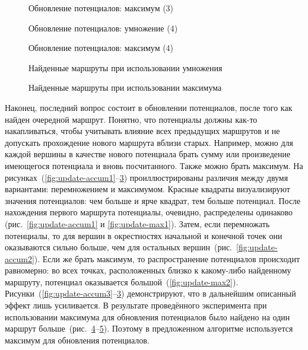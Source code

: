 \begin{figure}
    \caption{Обновление потенциалов: максимум (3)}
    \label{fig:update-max3}
\end{figure}

\begin{figure}
    \caption{Обновление потенциалов: умножение (4)}
    \label{fig:update-accum4}
\end{figure}

\begin{figure}
    \caption{Обновление потенциалов: максимум (4)}
    \label{fig:update-max4}
\end{figure}

\begin{figure}
    \caption{Найденные маршруты при использовании умножения}
    \label{fig:update-accum-result}
\end{figure}

\begin{figure}
    \caption{Найденные маршруты при использовании максимума}
    \label{fig:update-max-result}
\end{figure}

Наконец, последний вопрос состоит в обновлении потенциалов, после того
как найден очередной маршрут. Понятно, что потенциалы должны как-то
накапливаться, чтобы учитывать влияние всех предыдущих маршрутов и не
допускать прохождение нового маршрута вблизи старых. Например, можно
для каждой вершины в качестве нового потенциала брать сумму или
произведение имеющегося потенциала и вновь посчитанного. Также можно
брать максимум. На
рисунках~(\ref{fig:update-accum1}--\ref{fig:update-max4})
проиллюстрированы различия между двумя вариантами: перемножением и
максимумом. Красные квадраты визуализируют значения потенциалов: чем
больше и ярче квадрат, тем больше потенциал. После нахождения первого
маршрута потенциалы, очевидно, распределены одинаково
(рис.~\ref{fig:update-accum1} и \ref{fig:update-max1}). Затем, если
перемножать потенциалы, то для вершин в окрестностях начальной и
конечной точек они оказываются сильно больше, чем для остальных
вершин~(рис.~\ref{fig:update-accum2}). Если же брать максимум, то
распространение потенциалов происходит равномерно: во всех точках,
расположенных близко к какому-либо найденному маршруту, потенциал
оказывается большой~(\ref{fig:update-max2}).
Рисунки~(\ref{fig:update-accum3}--\ref{fig:update-max4})
демонстрируют, что в дальнейшим описанный эффект лишь усиливается. В
результате проведённого эксперимента при использовании максимума для
обновления потенциалов было найдено на один маршрут
больше~(рис.~\ref{fig:update-accum-result}--\ref{fig:update-max-result}).
Поэтому в предложенном алгоритме используется максимум для обновления
потенциалов.

\FloatBarrier

